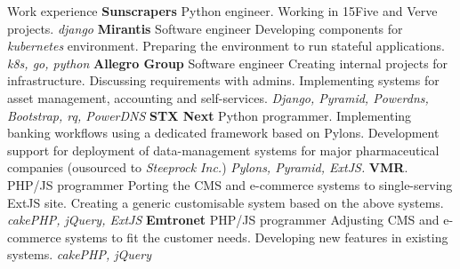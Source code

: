 \begin{rubric}{Work experience}
\textbf{Sunscrapers}\newline
    Python engineer. Working in 15Five and Verve projects.\newline
    \textit{django}
\textbf{Mirantis}\newline
    Software engineer\newline
    Developing components for \textit{kubernetes} environment. Preparing the
    environment to run stateful applications.
    \textit{k8s, go, python}
\textbf{Allegro Group}\newline
    Software engineer\newline
    Creating internal projects for infrastructure. Discussing requirements with
    admins. Implementing systems for asset management, accounting and
    self-services.
    \textit{Django, Pyramid, Powerdns, Bootstrap, rq, PowerDNS}
\textbf{STX Next}\newline
    Python programmer.\newline
    Implementing banking workflows using a dedicated framework based on Pylons.
    Development support for deployment of data-management systems for major
    pharmaceutical companies (ousourced to \textit{Steeprock Inc.})
    \textit{Pylons, Pyramid, ExtJS.}\newline
{}\textbf{VMR}.
    PHP/JS programmer\newline
    Porting the CMS and \hbox{e-commerce} systems to single-serving ExtJS site.
    Creating a generic customisable system based on the above systems.
    \textit{cakePHP, jQuery, ExtJS}
\textbf{Emtronet} 
    PHP/JS programmer\newline
    Adjusting CMS and \hbox{e-commerce} systems to fit the customer needs.
    Developing new features in existing systems.
    \textit{cakePHP, jQuery}
\end{rubric}
